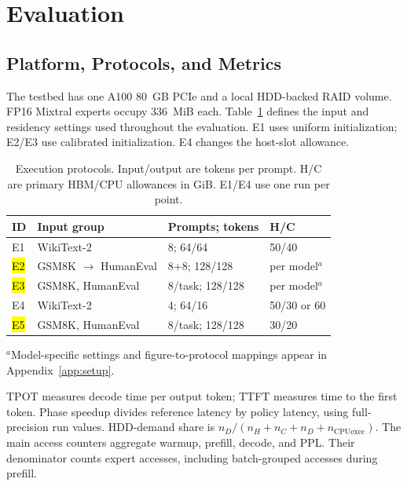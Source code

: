 \documentclass[conference,9pt,letterpaper]{IEEEtran}
\DeclareRobustCommand{\pending}[1]{{\sethlcolor{yellow}\hl{#1}}}
\begin{document}
\section{Evaluation}
\label{sec:evaluation}
\subsection{Platform, Protocols, and Metrics}
The testbed has one A100 80~GB PCIe and a local HDD-backed RAID volume. FP16 Mixtral experts occupy 336~MiB each. Table~\ref{tab:protocols} defines the input and residency settings used throughout the evaluation. E1 uses uniform initialization; E2/E3 use calibrated initialization. E4 changes the host-slot allowance.

\begin{table}[H]
\centering
\caption{Execution protocols. Input/output are tokens per prompt. H/C are primary HBM/CPU allowances in GiB. E1/E4 use one run per point.}
\label{tab:protocols}
\setlength{\tabcolsep}{3pt}
\renewcommand{\arraystretch}{1.10}
\begin{tabular}{@{}lp{0.94in}p{0.70in}p{0.72in}@{}}
\toprule
ID & Input group & Prompts; tokens & H/C \\
\midrule
E1 & WikiText-2 & 8; 64/64 & 50/40 \\
\pending{E2} & GSM8K $\to$ HumanEval & 8+8; 128/128 & per model$^{a}$ \\
\pending{E3} & GSM8K, HumanEval & 8/task; 128/128 & per model$^{a}$ \\
E4 & WikiText-2 & 4; 64/16 & 50/30 or 60 \\
\pending{E5} & GSM8K, HumanEval & 8/task; 128/128 & 30/20 \\
\bottomrule
\end{tabular}
\par\smallskip
\raggedright $^{a}$Model-specific settings and figure-to-protocol mappings appear in Appendix~\ref{app:setup}.
\end{table}

TPOT measures decode time per output token; TTFT measures time to the first token. Phase speedup divides reference latency by policy latency, using full-precision run values. HDD-demand share is $n_D/(n_H+n_C+n_D+n_{\mathrm{CPUexec}})$. The main access counters aggregate warmup, prefill, decode, and PPL. Their denominator counts expert accesses, including batch-grouped accesses during prefill.
\end{document}
